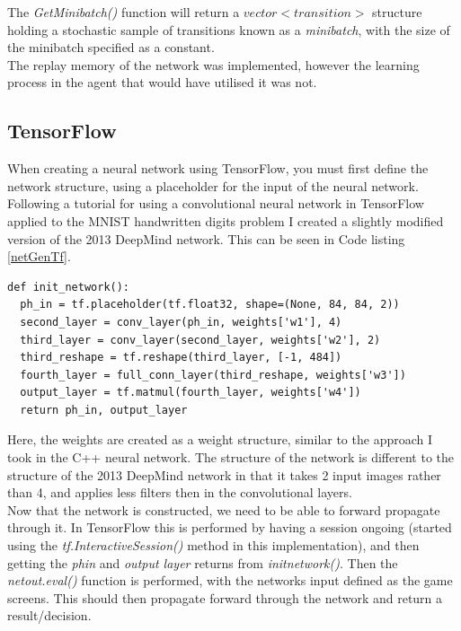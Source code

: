 \documentclass[10pt]{article}
\begin{document}
		The \textit{GetMinibatch()} function will return a $vector<transition>$ structure holding a stochastic sample of transitions known as a \textit{minibatch}, with the size of the minibatch specified as a constant.\\
		
		The replay memory of the network was implemented, however the learning process in the agent that would have utilised it was not.
	\medskip	
	
	\subsection{TensorFlow}
		When creating a neural network using TensorFlow, you must first define the network structure, using a placeholder for the input of the neural network. Following a tutorial for using a convolutional neural network in TensorFlow applied to the MNIST handwritten digits problem \cite{tfTut} I created a slightly modified version of the 2013 DeepMind network. This can be seen in Code listing \ref{netGenTf}.
						\renewcommand{\lstlistingname}{Code Listing}
		\begin{lstlisting}[caption={Network generation in TensorFlow},label={netGenTf}]	
def init_network():
  ph_in = tf.placeholder(tf.float32, shape=(None, 84, 84, 2))
  second_layer = conv_layer(ph_in, weights['w1'], 4)
  third_layer = conv_layer(second_layer, weights['w2'], 2)
  third_reshape = tf.reshape(third_layer, [-1, 484])
  fourth_layer = full_conn_layer(third_reshape, weights['w3'])
  output_layer = tf.matmul(fourth_layer, weights['w4'])
  return ph_in, output_layer
		\end{lstlisting}
		
		Here, the weights are created as a weight structure, similar to the approach I took in the C++ neural network. The structure of the network is different to the structure of the 2013 DeepMind network in that it takes 2 input images rather than 4, and applies less filters then in the convolutional layers.\\
		
		Now that the network is constructed, we need to be able to forward propagate through it. In TensorFlow this is performed by having a session ongoing (started using the \textit{tf.InteractiveSession()} method in this implementation), and then getting the \textit{ph\textunderscore in} and \textit{output \textunderscore layer} returns from \textit{init\textunderscore network()}. Then the \textit{net\textunderscore out.eval()} function is performed, with the networks input defined as the game screens. This should then propagate forward through the network and return a result/decision.\\
		
\end{document}
